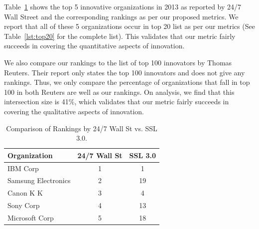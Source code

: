 Table~\ref{tab:validation} shows the top 5 innovative organizations in 2013 as
reported by 24/7 Wall Street and the corresponding rankings as per our
proposed metrics. We report that all of these 5 organizations occur in top 20
list as per our metrics (See Table~\ref{lst:top20} for the complete list).
This validates that our metric fairly succeeds in covering the quantitative
aspects of innovation.

We also compare our rankings to the list of top 100 innovators by Thomas
Reuters. Their report only states the top 100 innovators and does not give any
rankings. Thus, we only compare the percentage of organizations that fall in
top 100 in both Reuters are well as our rankings. On analysis, we find that
this intersection size is 41\%, which validates that our metric fairly
succeeds in covering the qualitative aspects of innovation.

\begin{table}[h]
\centering
\begin{tabular}{|l|c|c|}
\hline
\textbf{Organization}        & \multicolumn{1}{l|}{\textbf{24/7 Wall St}} & \multicolumn{1}{l|}{\textbf{SSL 3.0}} \\ \hline
IBM Corp                     & 1                                          & 1                                         \\ \hline
Samsung Electronics          & 2                                          & 19                                        \\ \hline
Canon K K                    & 3                                          & 4                                         \\ \hline
Sony Corp                    & 4                                          & 13                                        \\ \hline
Microsoft Corp               & 5                                          & 18                                        \\ \hline
\end{tabular}
\caption{Comparison of Rankings by 24/7 Wall St vs. SSL 3.0.}
\label{tab:validation}
\end{table}

